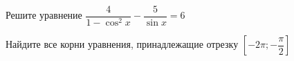 \begin{ex}
	\begin{condition}
		\begin{enumcols}[label=\asbuk*)]
			\item Решите уравнение \( \dfrac{4}{1 - \cos^2 x} - \dfrac{5}{\sin x } = 6 \)
			\item Найдите все корни уравнения, принадлежащие отрезку \( \left[-2\pi;-\dfrac{\pi}{2}\right] \)
		\end{enumcols}
	\end{condition}
\end{ex}